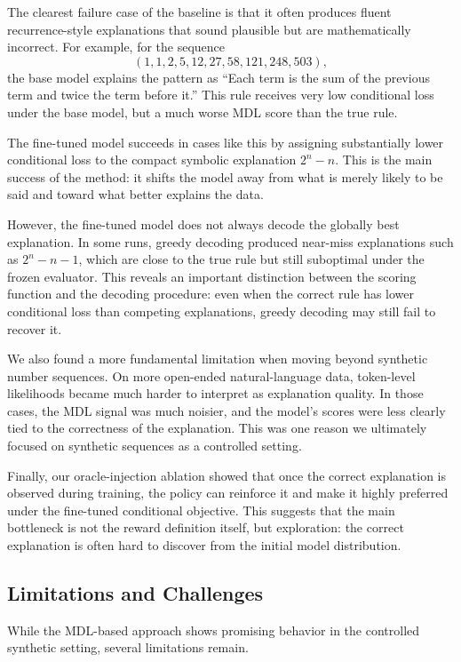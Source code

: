 \documentclass{article}
\theoremstyle{plain}
\theoremstyle{definition}
\theoremstyle{remark}
\begin{document}
The clearest failure case of the baseline is that it often produces fluent recurrence-style explanations that sound plausible but are mathematically incorrect. For example, for the sequence
\[
(1,1,2,5,12,27,58,121,248,503),
\]
the base model explains the pattern as ``Each term is the sum of the previous term and twice the term before it.'' This rule receives very low conditional loss under the base model, but a much worse MDL score than the true rule.

The fine-tuned model succeeds in cases like this by assigning substantially lower conditional loss to the compact symbolic explanation $2^n-n$. This is the main success of the method: it shifts the model away from what is merely likely to be said and toward what better explains the data.

However, the fine-tuned model does not always decode the globally best explanation. In some runs, greedy decoding produced near-miss explanations such as $2^n-n-1$, which are close to the true rule but still suboptimal under the frozen evaluator. This reveals an important distinction between the scoring function and the decoding procedure: even when the correct rule has lower conditional loss than competing explanations, greedy decoding may still fail to recover it.

We also found a more fundamental limitation when moving beyond synthetic number sequences. On more open-ended natural-language data, token-level likelihoods became much harder to interpret as explanation quality. In those cases, the MDL signal was much noisier, and the model's scores were less clearly tied to the correctness of the explanation. This was one reason we ultimately focused on synthetic sequences as a controlled setting.

Finally, our oracle-injection ablation showed that once the correct explanation is observed during training, the policy can reinforce it and make it highly preferred under the fine-tuned conditional objective. This suggests that the main bottleneck is not the reward definition itself, but exploration: the correct explanation is often hard to discover from the initial model distribution.
\subsection{Limitations and Challenges}

While the MDL-based approach shows promising behavior in the controlled synthetic setting, several limitations remain.
\end{document}
